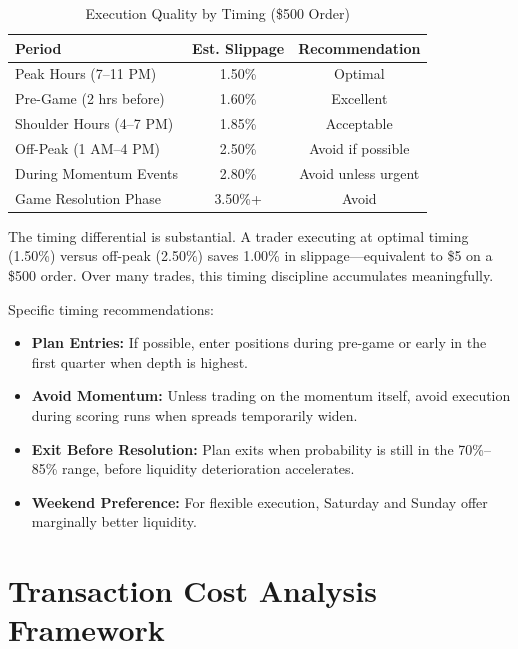 \begin{table}[H]
\centering
\caption{Execution Quality by Timing (\$500 Order)}
\label{tab:execution-timing}
\begin{tabular}{lcc}
\toprule
\textbf{Period} & \textbf{Est. Slippage} & \textbf{Recommendation} \\
\midrule
Peak Hours (7--11 PM) & 1.50\% & Optimal \\
Pre-Game (2 hrs before) & 1.60\% & Excellent \\
Shoulder Hours (4--7 PM) & 1.85\% & Acceptable \\
Off-Peak (1 AM--4 PM) & 2.50\% & Avoid if possible \\
During Momentum Events & 2.80\% & Avoid unless urgent \\
Game Resolution Phase & 3.50\%+ & Avoid \\
\bottomrule
\end{tabular}
\end{table}

The timing differential is substantial. A trader executing at optimal timing (1.50\%) versus off-peak (2.50\%) saves 1.00\% in slippage---equivalent to \$5 on a \$500 order. Over many trades, this timing discipline accumulates meaningfully.

Specific timing recommendations:

\begin{itemize}
    \item \textbf{Plan Entries:} If possible, enter positions during pre-game or early in the first quarter when depth is highest.
    \item \textbf{Avoid Momentum:} Unless trading on the momentum itself, avoid execution during scoring runs when spreads temporarily widen.
    \item \textbf{Exit Before Resolution:} Plan exits when probability is still in the 70\%--85\% range, before liquidity deterioration accelerates.
    \item \textbf{Weekend Preference:} For flexible execution, Saturday and Sunday offer marginally better liquidity.
\end{itemize}

\section{Transaction Cost Analysis Framework}

